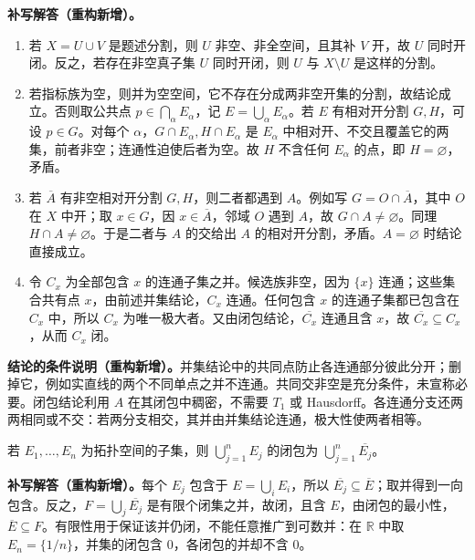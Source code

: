\documentclass[../../main.tex]{subfiles}%
\begin{document}
\begin{solution}
\textbf{补写解答（重构新增）。}
\begin{enumerate}
\item 若 $X=U\cup V$ 是题述分割，则 $U$ 非空、非全空间，且其补 $V$ 开，故 $U$ 同时开闭。反之，若存在非空真子集 $U$ 同时开闭，则 $U$ 与 $X\setminus U$ 是这样的分割。
\item 若指标族为空，则并为空空间，它不存在分成两非空开集的分割，故结论成立。否则取公共点 $p\in\bigcap_\alpha E_\alpha$，记 $E=\bigcup_\alpha E_\alpha$。若 $E$ 有相对开分割 $G,H$，可设 $p\in G$。对每个 $\alpha$，$G\cap E_\alpha,H\cap E_\alpha$ 是 $E_\alpha$ 中相对开、不交且覆盖它的两集，前者非空；连通性迫使后者为空。故 $H$ 不含任何 $E_\alpha$ 的点，即 $H=\varnothing$，矛盾。
\item 若 $\overline A$ 有非空相对开分割 $G,H$，则二者都遇到 $A$。例如写 $G=O\cap\overline A$，其中 $O$ 在 $X$ 中开；取 $x\in G$，因 $x\in\overline A$，邻域 $O$ 遇到 $A$，故 $G\cap A\ne\varnothing$。同理 $H\cap A\ne\varnothing$。于是二者与 $A$ 的交给出 $A$ 的相对开分割，矛盾。$A=\varnothing$ 时结论直接成立。
\item 令 $C_x$ 为全部包含 $x$ 的连通子集之并。候选族非空，因为 $\{x\}$ 连通；这些集合共有点 $x$，由前述并集结论，$C_x$ 连通。任何包含 $x$ 的连通子集都已包含在 $C_x$ 中，所以 $C_x$ 为唯一极大者。又由闭包结论，$\overline{C_x}$ 连通且含 $x$，故 $\overline{C_x}\subseteq C_x$，从而 $C_x$ 闭。
\end{enumerate}
\end{solution}
\begin{remark}
\textbf{结论的条件说明（重构新增）。}并集结论中的共同点防止各连通部分彼此分开；删掉它，例如实直线的两个不同单点之并不连通。共同交非空是充分条件，未宣称必要。闭包结论利用 $A$ 在其闭包中稠密，不需要 $T_1$ 或 Hausdorff。各连通分支还两两相同或不交：若两分支相交，其并由并集结论连通，极大性使两者相等。
\end{remark}
\begin{exercise}\label{exercise:ch04-finite-union-closure}
若 $E_1,\ldots,E_n$ 为拓扑空间的子集，则 $\bigcup_{j=1}^nE_j$ 的闭包为 $\bigcup_{j=1}^n\overline{E_j}$。
\end{exercise}
\begin{solution}
\textbf{补写解答（重构新增）。}每个 $E_j$ 包含于 $E=\bigcup_iE_i$，所以 $\overline{E_j}\subseteq\overline E$；取并得到一向包含。反之，$F=\bigcup_j\overline{E_j}$ 是有限个闭集之并，故闭，且含 $E$，由闭包的最小性，$\overline E\subseteq F$。有限性用于保证该并仍闭，不能任意推广到可数并：在 $\mathbb R$ 中取 $E_n=\{1/n\}$，并集的闭包含 $0$，各闭包的并却不含 $0$。
\end{solution}
\end{document}
